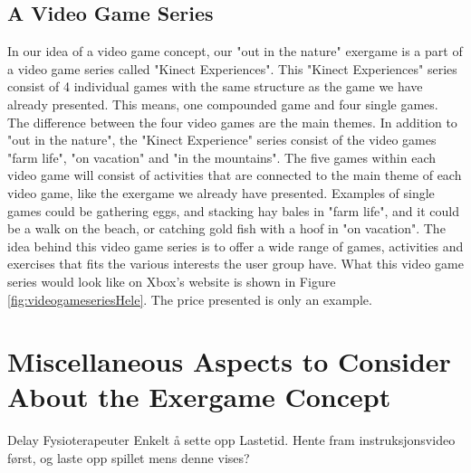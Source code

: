 \subsection{A Video Game Series}
In our idea of a video game concept, our "out in the nature" exergame is a part of a video game series called "Kinect Experiences". This "Kinect Experiences" series consist of 4 individual games with the same structure as the game we have already presented. This means, one compounded game and four single games. The difference between the four video games are the main themes. In addition to "out in the nature", the "Kinect Experience" series consist of the video games "farm life", "on vacation" and "in the mountains". The five games within each video game will consist of activities that are connected to the main theme of each video game, like the exergame we already have presented. Examples of single games could be gathering eggs, and stacking hay bales in "farm life", and it could be a walk on the beach, or catching gold fish with a hoof in "on vacation". The idea behind this video game series is to offer a wide range of games, activities and exercises that fits the various interests the user group have. What this video game series would look like on Xbox's website is shown in Figure \ref{fig:videogameseriesHele}. The price presented is only an example. 



\section{Miscellaneous Aspects to Consider About the Exergame Concept}
\label{sec:misc}

Delay
Fysioterapeuter
Enkelt å sette opp
Lastetid. Hente fram instruksjonsvideo først, og laste opp spillet mens denne vises?

